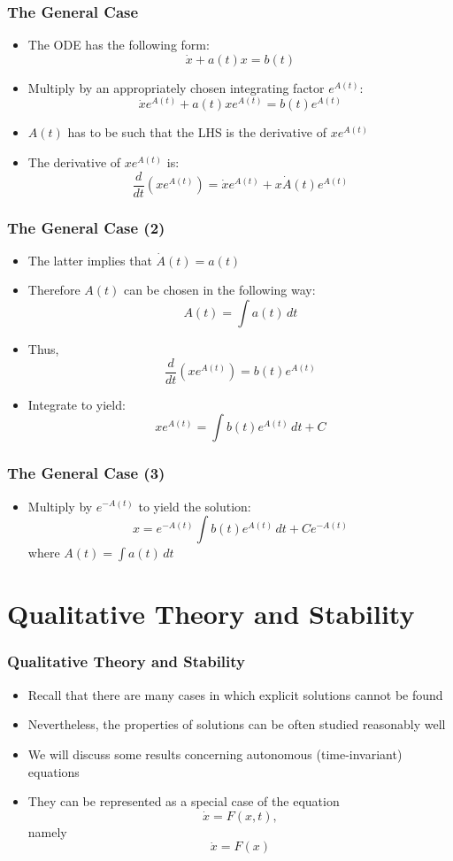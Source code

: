 \documentclass[10pt,usenames,dvipsnames]{beamer}
\theoremstyle{definition}
\begin{document}
\begin{frame}[fragile]
\frametitle{The General Case}
\begin{itemize}
	\item The ODE has the following form:
	\[
		\dot{x} + a(t)x = b(t)
	\]
	\item Multiply by an appropriately chosen integrating factor $e^{A(t)}$:
	\[
		\dot{x}e^{A(t)} + a(t)xe^{A(t)} = b(t)e^{A(t)}
	\]
	\item $A(t)$ has to be such that the LHS is the derivative of $xe^{A(t)}$
	\item The derivative of $xe^{A(t)}$ is:
	\[
		\dfrac{d}{dt}(xe^{A(t)}) = \dot{x}e^{A(t)} + x\dot{A}(t)e^{A(t)}
	\]
\end{itemize}
\end{frame}

\begin{frame}[fragile]
\frametitle{The General Case (2)}
\begin{itemize}
	\item The latter implies that $\dot{A}(t) = a(t)$
	\item Therefore $A(t)$ can be chosen in the following way:
	\[
		A(t) = \int a(t)\, dt
	\]
	\item Thus,
	\[
		\dfrac{d}{dt}(xe^{A(t)}) = b(t)e^{A(t)}
	\]
	\item Integrate to yield:
	\[
		xe^{A(t)} = \int b(t)e^{A(t)}\,dt + C
	\]
\end{itemize}
\end{frame}

\begin{frame}[fragile]
\frametitle{The General Case (3)}
\begin{itemize}
	\item Multiply by $e^{-A(t)}$ to yield the solution:
	\[
		x = e^{-A(t)}\int b(t)e^{A(t)}\,dt + Ce^{-A(t)}
	\]
	where $A(t) = \displaystyle\int a(t)\, dt$
\end{itemize}
\end{frame}

\section{Qualitative Theory and Stability}
\begin{frame}[fragile]
\frametitle{Qualitative Theory and Stability}
\begin{itemize}
	\item Recall that there are many cases in which explicit solutions cannot be found
	\item Nevertheless, the properties of solutions can be often studied reasonably well
	\item We will discuss some results concerning autonomous (time-invariant) equations
	\item They can be represented as a special case of the equation
	\[
		\dot{x} = F(x,t),
	\]
	\noindent namely
	\[
		\dot{x} = F(x)
	\]
	
\end{itemize}
\end{frame}
\end{document}
